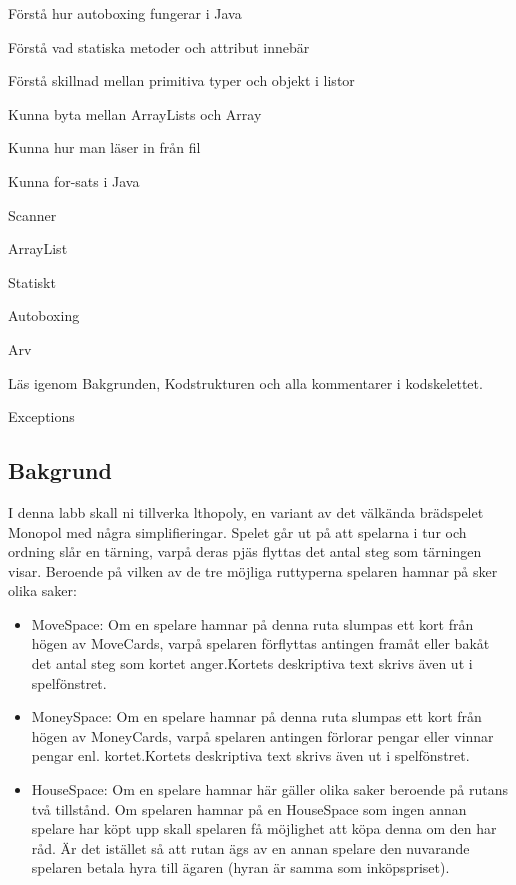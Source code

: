 

\Lab{\LabWeekELEVEN}

\begin{Goals}
\item Förstå hur autoboxing fungerar i Java
\item Förstå vad statiska metoder och attribut innebär
\item Förstå skillnad mellan primitiva typer och objekt i listor
\item Kunna byta mellan ArrayLists och Array
\item Kunna hur man läser in från fil
\item Kunna for-sats i Java
\end{Goals}

\begin{Preparations}
\item Scanner
\item ArrayList
\item Statiskt
\item Autoboxing
\item Arv
\item Läs igenom Bakgrunden, Kodstrukturen och alla kommentarer i kodskelettet.
\item Exceptions
\end{Preparations}

\subsection{Bakgrund}
I denna labb skall ni tillverka lthopoly, en variant av det välkända brädspelet Monopol med några simplifieringar. Spelet går ut på att spelarna i tur och ordning slår en tärning, varpå deras pjäs flyttas det antal steg som tärningen visar. 
Beroende på vilken av de tre möjliga ruttyperna spelaren hamnar på sker olika saker:

\begin{itemize}
\item MoveSpace: Om en spelare hamnar på denna ruta slumpas ett kort från högen av MoveCards, varpå spelaren förflyttas antingen framåt eller bakåt det antal steg som kortet anger.Kortets deskriptiva text skrivs även ut i spelfönstret.
\item MoneySpace: Om en spelare hamnar på denna ruta slumpas ett kort från högen av MoneyCards, varpå spelaren antingen förlorar pengar eller vinnar pengar enl. kortet.Kortets deskriptiva text skrivs även ut i spelfönstret.
\item HouseSpace: Om en spelare hamnar här gäller olika saker beroende på rutans två tillstånd. Om spelaren hamnar på en HouseSpace som ingen annan spelare har köpt upp skall spelaren få möjlighet att köpa denna om den har råd. Är det istället så att rutan ägs av en annan spelare den nuvarande spelaren betala hyra till ägaren (hyran är samma som inköpspriset). 
\end{itemize}


